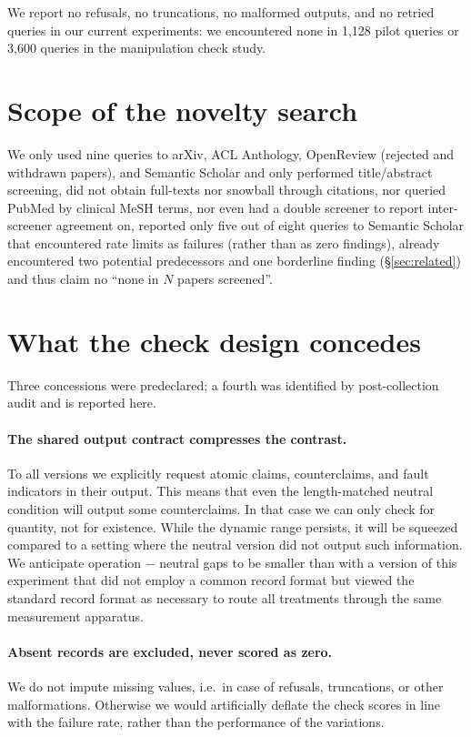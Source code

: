 We report no refusals, no truncations, no malformed outputs, and no retried queries in our current
experiments: we encountered none in 1,128 pilot queries or 3,600 queries in the manipulation check
study.

\section{Scope of the novelty search}
\label{app:novelty-search}

We only used nine queries to arXiv, ACL Anthology, OpenReview (rejected and withdrawn papers), and
Semantic Scholar and only performed title/abstract screening, did not obtain full-texts nor snowball
through citations, nor queried PubMed by clinical MeSH terms, nor even had a double screener to
report inter-screener agreement on, reported only five out of eight queries to Semantic Scholar that
encountered rate limits as failures (rather than as zero findings), already encountered two
potential predecessors and one borderline finding (\S\ref{sec:related}) and thus claim no ``none in
$N$ papers screened''.

\section{What the check design concedes}
\label{app:concedes}

Three concessions were predeclared; a fourth was identified by post-collection audit and is reported
here.

\paragraph{The shared output contract compresses the contrast.}
To all versions we explicitly request atomic claims, counterclaims, and fault indicators in their
output. This means that even the length-matched neutral condition will output some counterclaims. In
that case we can only check for quantity, not for existence. While the dynamic range persists, it
will be squeezed compared to a setting where the neutral version did not output such information. We
anticipate operation $-$ neutral gaps to be smaller than with a version of this experiment that did
not employ a common record format but viewed the standard record format as necessary to route all
treatments through the same measurement apparatus.

\paragraph{Absent records are excluded, never scored as zero.}
We do not impute missing values, i.e.\ in case of refusals, truncations, or other malformations.
Otherwise we would artificially deflate the check scores in line with the failure rate, rather than
the performance of the variations.

